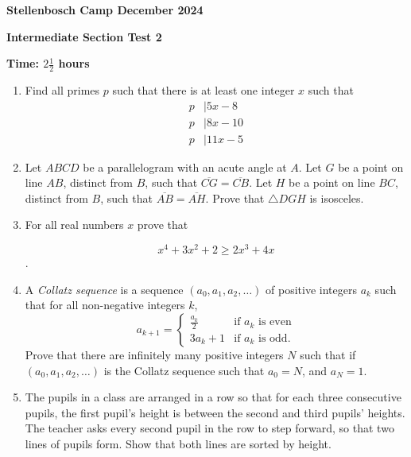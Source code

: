 \documentclass[12pt]{article}
\begin{document}
\begin{center} \large
\textbf{Stellenbosch Camp December 2024}

\textbf{Intermediate Section Test 2}

\textbf{Time: \(2 \frac{1}{2}\) hours}
\end{center}
\begin{enumerate}[topsep=2\bigskipamount,itemsep=\bigskipamount]
\item Find all primes $p$
such that there is at least one integer $x$
such that
\begin{align*}
p &|5x-8
\\ p &|8x-10
\\ p &|11x-5
\end{align*}

\item Let $ABCD$ be a parallelogram with an acute angle at $A$. Let $G$ be a point on line $AB$, distinct from $B$, such that $\overline{CG}=\overline{CB}$. Let $H$ be a point on line $BC$, distinct from $B$, such that $\overline{AB}=\overline{AH}$. Prove that $\triangle DGH$ is isosceles.  
\item For all real numbers $x$ prove that

$$x^4 + 3x^2 + 2 \geq 2x^3 + 4x$$.

\item A \emph{Collatz sequence} is a sequence \((a_{0}, a_{1}, a_{2}, \ldots)\) of positive integers \(a_{k}\) such that for all non-negative integers \(k\),
\[a_{k + 1} = \begin{cases}
\frac{a_{k}}{2} & \textrm{if \(a_{k}\) is even}\\
3a_{k} + 1 & \textrm{if \(a_{k}\) is odd.}
\end{cases}\]
Prove that there are infinitely many positive integers \(N\) such that if \((a_{0}, a_{1}, a_{2}, \ldots)\) is the Collatz sequence such that \(a_{0} = N\), and     \(a_{N} = 1\).
\item The pupils in a class are arranged in a row so that for each three consecutive pupils, the first pupil's height is between the second and third pupils' heights. The teacher asks every second pupil in the row to step forward, so that two lines of pupils form. Show that both lines are sorted by height.
\end{enumerate}
\end{document}
